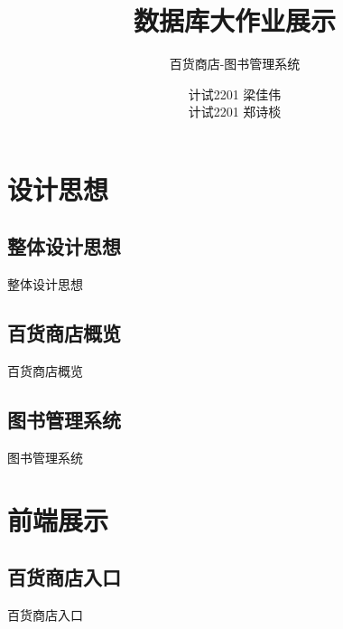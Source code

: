 \documentclass{ctexbeamer}
\title{数据库大作业展示}
\subtitle{百货商店-图书管理系统}
\author{计试2201 梁佳伟\\计试2201 郑诗棪}
\institute[Xi'an Jiaotong University]{
  西安交通大学
}
\date{}
\begin{document}
\begin{frame}
  \titlepage
\end{frame}

\section{设计思想}

\subsection{整体设计思想}
\begin{frame}{整体设计思想}


\end{frame}


\subsection{百货商店概览}
\begin{frame}{百货商店概览}


\end{frame}


\subsection{图书管理系统}
\begin{frame}{图书管理系统}
\end{frame}

\section{前端展示}



\subsection{百货商店入口}
\begin{frame}{百货商店入口}



\end{frame}
\end{document}
